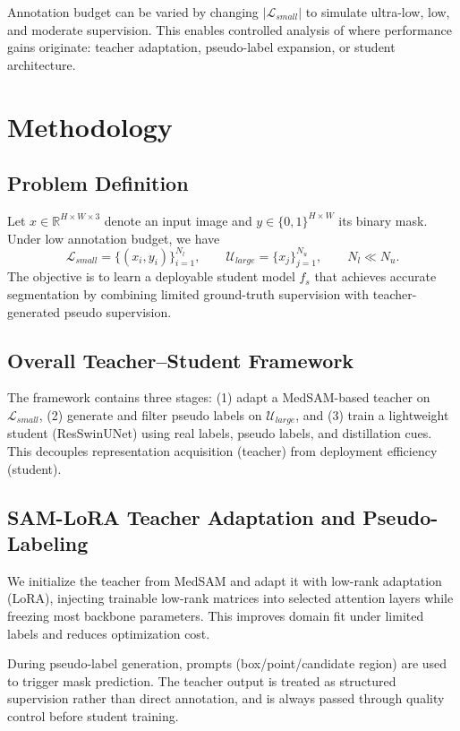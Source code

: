 ﻿\documentclass[11pt]{article}
\begin{document}
Annotation budget can be varied by changing $|\mathcal{L}_{small}|$ to simulate ultra-low, low, and moderate supervision. This enables controlled analysis of where performance gains originate: teacher adaptation, pseudo-label expansion, or student architecture.

\section{Methodology}
\subsection{Problem Definition}
Let $x \in \mathbb{R}^{H \times W \times 3}$ denote an input image and $y \in \{0,1\}^{H \times W}$ its binary mask. Under low annotation budget, we have
\begin{equation}
\mathcal{L}_{small} = \{(x_i,y_i)\}_{i=1}^{N_l}, \qquad
\mathcal{U}_{large} = \{x_j\}_{j=1}^{N_u}, \qquad N_l \ll N_u.
\end{equation}
The objective is to learn a deployable student model $f_s$ that achieves accurate segmentation by combining limited ground-truth supervision with teacher-generated pseudo supervision.

\subsection{Overall Teacher--Student Framework}
The framework contains three stages: (1) adapt a MedSAM-based teacher on $\mathcal{L}_{small}$, (2) generate and filter pseudo labels on $\mathcal{U}_{large}$, and (3) train a lightweight student (ResSwinUNet) using real labels, pseudo labels, and distillation cues. This decouples representation acquisition (teacher) from deployment efficiency (student).

\subsection{SAM-LoRA Teacher Adaptation and Pseudo-Labeling}
We initialize the teacher from MedSAM and adapt it with low-rank adaptation (LoRA), injecting trainable low-rank matrices into selected attention layers while freezing most backbone parameters. This improves domain fit under limited labels and reduces optimization cost.

During pseudo-label generation, prompts (box/point/candidate region) are used to trigger mask prediction. The teacher output is treated as structured supervision rather than direct annotation, and is always passed through quality control before student training.
\end{document}
